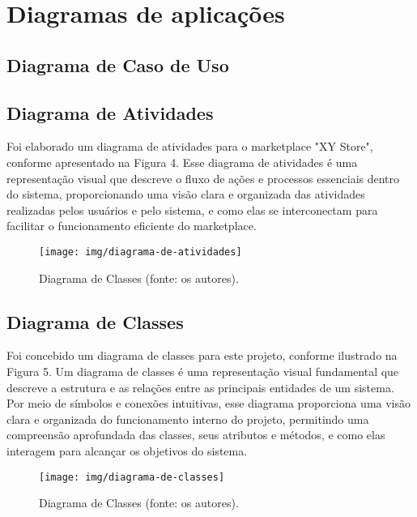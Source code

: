 \documentclass[
	12pt,				%
	openright,			%
	twoside,			%
	a4paper,			%
	english,			%
	brazil				%
	]{abntex2}
\begin{document}
\chapter{Diagramas de aplicações}\label{cap_diagama_de_aplicacoes}

\section{Diagrama de Caso de Uso}

\section{Diagrama de Atividades}

Foi elaborado um diagrama de atividades para o marketplace "XY Store", conforme apresentado na Figura 4. Esse diagrama de atividades é uma representação visual que descreve o fluxo de ações e processos essenciais dentro do sistema, proporcionando uma visão clara e organizada das atividades realizadas pelos usuários e pelo sistema, e como elas se interconectam para facilitar o funcionamento eficiente do marketplace.

\begin{figure}[htb]
	\centering
	\texttt{[image: img/diagrama-de-atividades]}
	\caption{Diagrama de Classes (fonte: os autores).}
	\label{fig:diagrama-de-atividades}
\end{figure}


\section{Diagrama de Classes}

Foi concebido um diagrama de classes para este projeto, conforme ilustrado na Figura 5. Um diagrama de classes é uma representação visual fundamental que descreve a estrutura e as relações entre as principais entidades de um sistema. Por meio de símbolos e conexões intuitivas, esse diagrama proporciona uma visão clara e organizada do funcionamento interno do projeto, permitindo uma compreensão aprofundada das classes, seus atributos e métodos, e como elas interagem para alcançar os objetivos do sistema.

\begin{figure}[htb]
	\centering
	\texttt{[image: img/diagrama-de-classes]}
	\caption{Diagrama de Classes (fonte: os autores).}
	\label{fig:diagrama-de-classes}
\end{figure}
\end{document}
